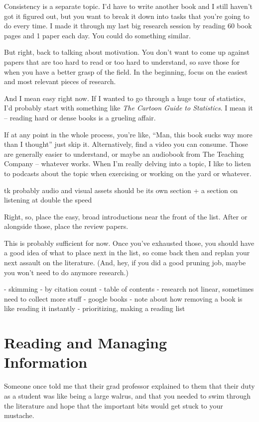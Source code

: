 Consistency is a separate topic. I'd have to write another book and I still
haven't got it figured out, but you want to break it down into tasks that you're
going to do every time. I made it through my last big research session by
reading 60 book pages and 1 paper each day. You could do something similar.

But right, back to talking about motivation. You don't want to come up against
papers that are too hard to read or too hard to understand, so save those for
when you have a better grasp of the field. In the beginning, focus on the
easiest and most relevant pieces of research.

And I mean easy right now. If I wanted to go through a huge tour of statistics,
I'd probably start with something like \textit{The Cartoon Guide to
  Statistics}. I mean it -- reading hard or dense books is a grueling affair.

If at any point in the whole process, you're like, ``Man, this book sucks way
more than I thought'' just skip it. Alternatively, find a video you can
consume. Those are generally easier to understand, or maybe an audiobook from
The Teaching Company -- whatever works. When I'm really delving into a topic, I
like to listen to podcasts about the topic when exercising or working on the
yard or whatever.

tk probably audio and visual assets should be its own section + a section on
listening at double the speed

Right, so, place the easy, broad introductions near the front of the list. After
or alongside those, place the review papers.

This is probably sufficient for now. Once you've exhausted those, you should
have a good idea of what to place next in the list, so come back then and replan
your next assault on the literature. (And, hey, if you did a good pruning job,
maybe you won't need to do anymore research.)

- skimming
- by citation count
- table of contents
- research not linear, sometimes need to collect more stuff
- google books
- note about how removing a book is like reading it instantly
- prioritizing, making a reading list

\section{Reading and Managing Information}

Someone once told me that their grad professor explained to them that their
duty as a student was like being a large walrus, and that you needed to swim
through the literature and hope that the important bits would get stuck to your
mustache.

